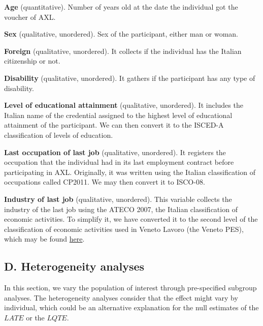 \documentclass[
  11pt]{article}
\begin{document}
\textbf{Age} (quantitative). Number of years old at the date the
individual got the voucher of AXL.

\textbf{Sex} (qualitative, unordered). Sex of the participant, either
man or woman.

\textbf{Foreign} (qualitative, unordered). It collects if the individual
has the Italian citizenship or not.

\textbf{Disability} (qualitative, unordered). It gathers if the
participant has any type of disability.

\textbf{Level of educational attainment} (qualitative, unordered). It
includes the Italian name of the credential assigned to the highest
level of educational attainment of the participant. We can then convert
it to the ISCED-A classification of levels of education.

\textbf{Last occupation of last job} (qualitative, unordered). It
registers the occupation that the individual had in its last employment
contract before participating in AXL. Originally, it was written using
the Italian classification of occupations called CP2011. We may then
convert it to ISCO-08.

\textbf{Industry of last job} (qualitative, unordered). This variable
collects the industry of the last job using the ATECO 2007, the Italian
classification of economic activities. To simplify it, we have converted
it to the second level of the classification of economic activities used
in Veneto Lavoro (the Veneto PES), which may be found
\href{https://www.venetolavoro.it/glossario-e-strumenti}{here}.

\clearpage

\subsection*{D. Heterogeneity analyses}\label{d.-heterogeneity-analyses}

In this section, we vary the population of interest through
pre-specified subgroup analyses. The heterogeneity analyses consider
that the effect might vary by individual, which could be an alternative
explanation for the null estimates of the \(LATE\) or the \(LQTE\).
\end{document}
